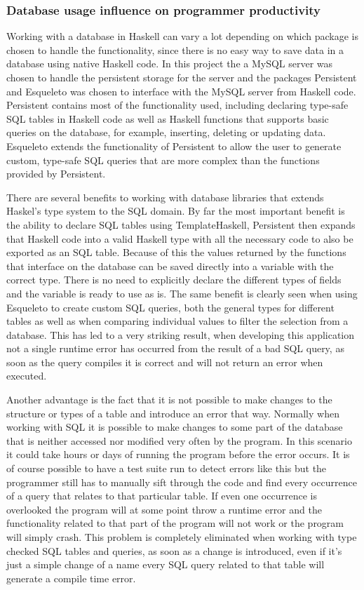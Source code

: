 \documentclass[a4paper]{article}
\begin{document}
\subsubsection{Database usage influence on programmer productivity}
Working with a database in Haskell can vary a lot depending on which package is chosen to handle the functionality, since there is no easy way to save data in a database using native Haskell code. In this project the a MySQL server was chosen to handle the persistent storage for the server and the packages Persistent\cite{persistent-yesod} and Esqueleto\cite{esqueleto-hackage} was chosen to interface with the MySQL server from Haskell code. Persistent contains most of the functionality used, including declaring type-safe SQL tables in Haskell code as well as Haskell functions that supports basic queries on the database, for example, inserting, deleting or updating data. Esqueleto extends the functionality of Persistent to allow the user to generate custom, type-safe SQL queries that are more complex than the functions provided by Persistent.

There are several benefits to working with database libraries that extends Haskel's type system to the SQL domain. By far the most important benefit is the ability to declare SQL tables using TemplateHaskell, Persistent then expands that Haskell code into a valid Haskell type with all the necessary code to also be exported as an SQL table. Because of this the values returned by the functions that interface on the database can be saved directly into a variable with the correct type. There is no need to explicitly declare the different types of fields and the variable is ready to use as is. The same benefit is clearly seen when using Esqueleto to create custom SQL queries, both the general types for different tables as well as when comparing individual values to filter the selection from a database. This has led to a very striking result, when developing this application not a single runtime error has occurred from the result of a bad SQL query, as soon as the query compiles it is correct and will not return an error when executed.

Another advantage is the fact that it is not possible to make changes to the structure or types of a table and introduce an error that way. Normally when working with SQL it is possible to make changes to some part of the database that is neither accessed nor modified very often by the program. In this scenario it could take hours or days of running the program before the error occurs. It is of course possible to have a test suite run to detect errors like this but the programmer still has to manually sift through the code and find every occurrence of a query that relates to that particular table. If even one occurrence is overlooked the program will at some point throw a runtime error and the functionality related to that part of the program will not work or the program will simply crash. This problem is completely eliminated when working with type checked SQL tables and queries, as soon as a change is introduced, even if it's just a simple change of a name every SQL query related to that table will generate a compile time error.
\end{document}
